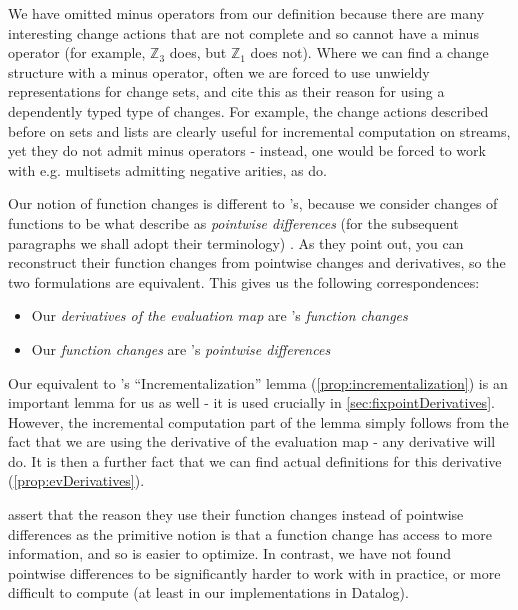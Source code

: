 We have omitted minus operators from our definition because
there are many interesting change actions that are not complete and so cannot 
have a minus operator (for example, $\mathbb{Z}_3$ does, but $\mathbb{Z}_1$ does
not). Where we can find a change structure with a minus operator, often we are
forced to use unwieldy representations for change sets, and
\citeauthor{cai2014changes} cite this as their reason for using a dependently
typed type of changes. For example, the change actions described before on sets and lists are clearly
useful for incremental computation on streams, yet they do not admit minus operators - instead, one would
be forced to work with e.g. multisets admitting negative arities, as \citeauthor{cai2014changes} do.

Our notion of function changes is different to \citeauthor{cai2014changes}'s,
because we consider changes of functions to be what \citeauthor{cai2014changes} describe as
\textit{pointwise differences} (for the subsequent paragraphs we shall adopt
their terminology) \autocite[See][section 2.2]{cai2014changes}. As they point out, you can reconstruct their
function changes from pointwise changes and derivatives, so the two formulations
are equivalent. This gives us the following correspondences:
\begin{itemize}
  \item Our \textit{derivatives of the
      evaluation map} are \citeauthor{cai2014changes}'s \textit{function changes}
  \item Our \textit{function changes} are \citeauthor{cai2014changes}'s \textit{pointwise differences}
\end{itemize}

Our equivalent to \citeauthor{cai2014changes}'s ``Incrementalization'' lemma
(\cref{prop:incrementalization}) is an important lemma for us as well - it is used
crucially in \cref{sec:fixpointDerivatives}. However, the incremental computation part of
the lemma simply follows from the fact that we are using the derivative of the
evaluation map - any derivative will do. It is then a further fact that we can
find actual definitions for this derivative (\cref{prop:evDerivatives}).

\citeauthor{cai2014changes} assert that the reason they use their function changes instead of pointwise
differences as the primitive notion is that a function change has access to more
information, and so is easier to optimize. In contrast, we have not found pointwise differences to be
significantly harder to work with in practice, or more difficult to compute (at least in our implementations
in Datalog).

